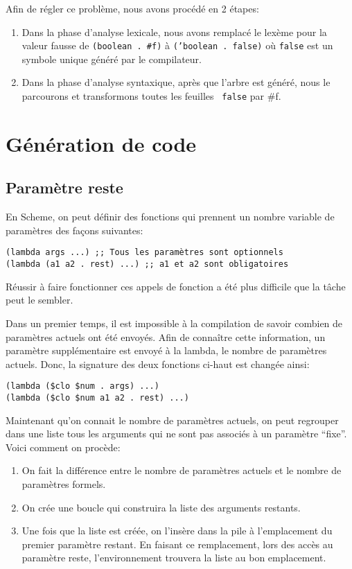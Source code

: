 \documentclass[11pt]{report}
\begin{document}
Afin de régler ce problème, nous avons procédé en 2 étapes:

\begin{enumerate}
\item Dans la phase d'analyse lexicale, nous avons remplacé le lexème
  pour la valeur fausse de {\tt (boolean . \#f)} à {\tt ('boolean .
    false)} où {\tt false} est un symbole unique généré par le
  compilateur.
\item Dans la phase d'analyse syntaxique, après que l'arbre est
  généré, nous le parcourons et transformons toutes les feuilles {\tt
    false} par \#f.
\end{enumerate}

\section{Génération de code}

\subsection{Paramètre reste}

En Scheme, on peut définir des fonctions qui prennent un nombre
variable de paramètres des façons suivantes:

\begin{verbatim}
(lambda args ...) ;; Tous les paramètres sont optionnels
(lambda (a1 a2 . rest) ...) ;; a1 et a2 sont obligatoires
\end{verbatim}

Réussir à faire fonctionner ces appels de fonction a été plus
difficile que la tâche peut le sembler.

Dans un premier temps, il est impossible à la compilation de savoir
combien de paramètres actuels ont été envoyés.  Afin de connaître
cette information, un paramètre supplémentaire est envoyé à la lambda,
le nombre de paramètres actuels.  Donc, la signature des deux
fonctions ci-haut est changée ainsi:

\begin{verbatim}
(lambda ($clo $num . args) ...)
(lambda ($clo $num a1 a2 . rest) ...)
\end{verbatim}

Maintenant qu'on connait le nombre de paramètres actuels, on peut
regrouper dans une liste tous les arguments qui ne sont pas associés
à un paramètre ``fixe''.  Voici comment on procède:

\begin{enumerate}
\item On fait la différence entre le nombre de paramètres actuels et
  le nombre de paramètres formels.
\item On crée une boucle qui construira la liste des arguments restants.
\item Une fois que la liste est créée, on l'insère dans la pile à
  l'emplacement du premier paramètre restant.  En faisant ce
  remplacement, lors des accès au paramètre reste, l'environnement
  trouvera la liste au bon emplacement.
\end{enumerate}
\end{document}
